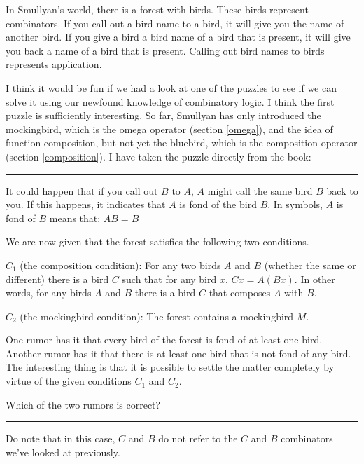 \documentclass[11pt]{article}
\begin{document}
In Smullyan's world, there is a forest with birds. These birds represent
combinators. If you call out a bird name to a bird, it will give you the name
of another bird. If you give a bird a bird name of a bird that is present, it
will give you back a name of a bird that is present. Calling out bird names to
birds represents application.

I think it would be fun if we had a look at one of the puzzles to see if we can
solve it using our newfound knowledge of combinatory logic. I think the first
puzzle is sufficiently interesting. So far, Smullyan has only introduced the
mockingbird, which is the omega operator (section \ref{omega}), and the idea of
function composition, but not yet the bluebird, which is the composition
operator (section \ref{composition}). I have taken the puzzle directly from the
book:

\setlength{\leftskip}{1cm}
\setlength{\rightskip}{1cm}
\begin{center}
\rule{15cm}{0.5pt}
\end{center}

It could happen that if you call out \(B\) to \(A\), \(A\) might call the same
bird \(B\) back to you. If this happens, it indicates that \(A\) is fond of the
bird \(B\). In symbols, \(A\) is fond of \(B\) means that: \(AB = B\)

We are now given that the forest satisfies the following two conditions. 

\(C_{1}\) (the composition condition): For any two birds \(A\) and \(B\)
(whether the same or different) there is a bird \(C\) such that for any bird
\(x\), \(Cx = A(Bx)\). In other words, for any birds \(A\) and \(B\) there is a
bird \(C\) that composes \(A\) with \(B\). 

\(C_{2}\) (the mockingbird condition): The forest contains a mockingbird \(M\). 

One rumor has it that every bird of the forest is fond of at least one bird.
Another rumor has it that there is at least one bird that is not fond of any
bird. The interesting thing is that it is possible to settle the matter
completely by virtue of the given conditions \(C_{1}\) and \(C_{2}\).

Which of the two rumors is correct? 

\begin{center}
\rule{15cm}{0.5pt}
\end{center}
\setlength{\leftskip}{0pt}
\setlength{\rightskip}{0pt}

Do note that in this case, \(C\) and \(B\) do not refer to the \(C\) and \(B\)
combinators we've looked at previously.
\end{document}
